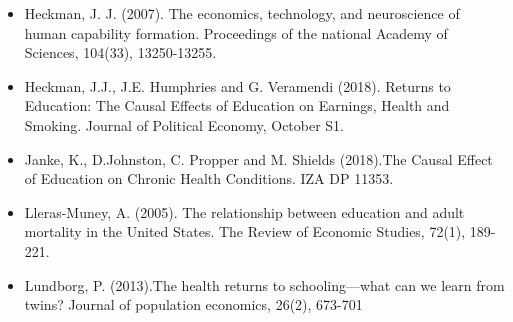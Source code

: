 \begin{itemize}
\item Heckman, J. J. (2007). The economics, technology, and neuroscience of human capability formation. Proceedings of the national
Academy of Sciences, 104(33), 13250-13255.
\item Heckman, J.J., J.E. Humphries and G. Veramendi (2018). Returns to Education: The Causal Effects of Education on Earnings, Health
and Smoking. Journal of Political Economy, October S1.
\item Janke, K., D.Johnston, C. Propper and M. Shields (2018).The Causal Effect of Education on Chronic Health Conditions. IZA DP 11353.
\item Lleras-Muney, A. (2005). The relationship between education and adult mortality in the United States. The Review of Economic
Studies, 72(1), 189-221.
\item Lundborg, P. (2013).The health returns to schooling—what can we learn from twins? Journal of population economics, 26(2), 673-701 
\end{itemize}